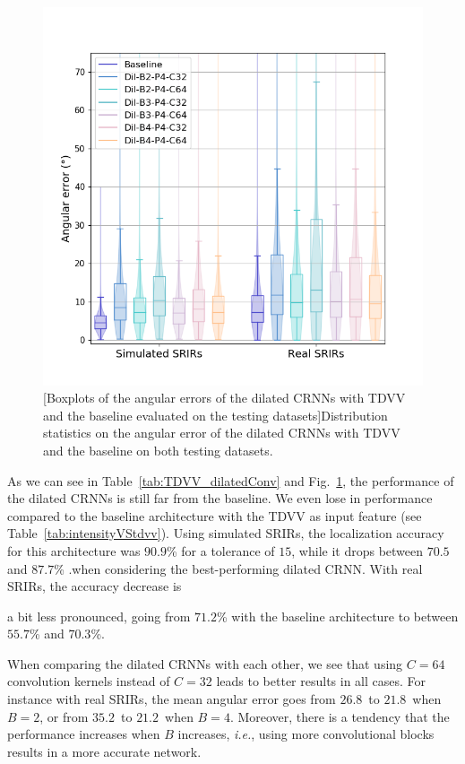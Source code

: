 \begin{figure}[ht]
    \begin{center}
    \includegraphics[width=0.5\linewidth]{Images/chap6/boxplots_dilatedConv.png}
    [Boxplots of the angular errors of the dilated CRNNs with TDVV and the baseline evaluated on the testing datasets]{Distribution statistics on the angular error of the dilated CRNNs with TDVV and the baseline on both testing datasets.}
    \label{fig:boxplots_dilatedConv}
    \end{center}
\end{figure}

As we can see in Table~\ref{tab:TDVV_dilatedConv} and Fig.~\ref{fig:boxplots_dilatedConv}, the performance of the dilated CRNNs is still far from the baseline. We even lose in performance compared to the baseline architecture with the TDVV as input feature (see Table~\ref{tab:intensityVStdvv}). Using simulated SRIRs, the localization accuracy for this architecture was $90.9$\% for a tolerance of $15$\textdegree, while it drops between $70.5$ and $87.7$\% .when considering the best-performing dilated CRNN. With real SRIRs, the accuracy decrease is 



a bit less pronounced, going from $71.2$\% with the baseline architecture to between $55.7$\% and $70.3$\%.

When comparing the dilated CRNNs with each other, we see that using $C=64$ convolution kernels instead of $C=32$ leads to better results in all cases. For instance with real SRIRs, the mean angular error goes from $26.8$\textdegree~to $21.8$\textdegree~when $B=2$, or from $35.2$\textdegree~to $21.2$\textdegree~when $B=4$. Moreover, there is a tendency that the performance increases when $B$ increases, \emph{i.e.}, using more convolutional blocks results in a more accurate network.

